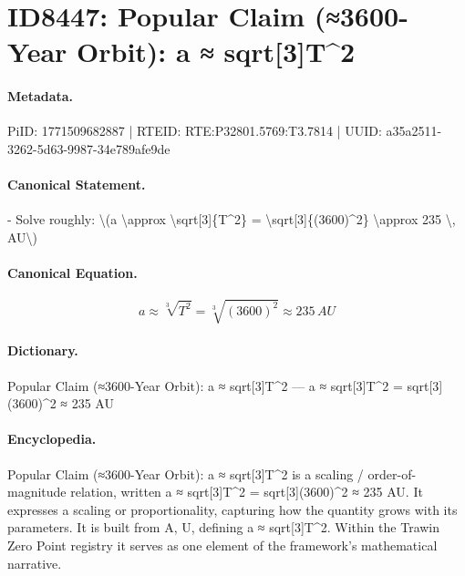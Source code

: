 \section*{ID8447: Popular Claim (≈3600-Year Orbit): a ≈ sqrt[3]T\textasciicircum{}2}
\paragraph{Metadata.}
PiID: 1771509682887 | RTEID: RTE:P32801.5769:T3.7814 | UUID: a35a2511-3262-5d63-9987-34e789afe9de

\paragraph{Canonical Statement.}
- Solve roughly: \textbackslash{}(a \textbackslash{}approx \textbackslash{}sqrt[3]\{T\textasciicircum{}2\} = \textbackslash{}sqrt[3]\{(3600)\textasciicircum{}2\} \textbackslash{}approx 235 \textbackslash{}, AU\textbackslash{})

\paragraph{Canonical Equation.}
\[
a \approx \sqrt[3]{T^2} = \sqrt[3]{(3600)^2} \approx 235 \, AU
\]

\paragraph{Dictionary.}
Popular Claim (≈3600-Year Orbit): a ≈ sqrt[3]T\textasciicircum{}2 — a ≈ sqrt[3]T\textasciicircum{}2 = sqrt[3](3600)\textasciicircum{}2 ≈ 235 AU

\paragraph{Encyclopedia.}
Popular Claim (≈3600-Year Orbit): a ≈ sqrt[3]T\textasciicircum{}2 is a scaling / order-of-magnitude relation, written a ≈ sqrt[3]T\textasciicircum{}2 = sqrt[3](3600)\textasciicircum{}2 ≈ 235 AU. It expresses a scaling or proportionality, capturing how the quantity grows with its parameters. It is built from A, U, defining a ≈ sqrt[3]T\textasciicircum{}2. Within the Trawin Zero Point registry it serves as one element of the framework's mathematical narrative.
